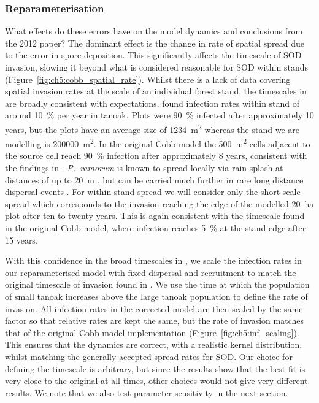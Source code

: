 \subsubsection{Reparameterisation}\label{sec:ch5:reparameterisation}

What effects do these errors have on the model dynamics and conclusions from the 2012 paper? The dominant effect is the change in rate of spatial spread due to the error in spore deposition. This significantly affects the timescale of SOD invasion, slowing it beyond what is considered reasonable for SOD within stands (Figure~\ref{fig:ch5:cobb_spatial_rate}). Whilst there is a lack of data covering spatial invasion rates at the scale of an individual forest stand, the timescales in \citet{cobb_ecosystem_2012} are broadly consistent with expectations. \citet{mcpherson_responses_2010} found infection rates within stand of around \SI{10}{\percent} per year in tanoak. Plots were \SI{90}{\percent} infected after approximately 10 years, but the plots have an average size of \SI{1234}{\meter\squared} whereas the stand we are modelling is \SI{200000}{\meter\squared}. In the original Cobb model the \SI{500}{\meter\squared} cells adjacent to the source cell reach \SI{90}{\percent} infection after approximately 8 years, consistent with the findings in \citet{mcpherson_responses_2010}. \textit{P.~ramorum} is known to spread locally via rain splash at distances of up to \SI{20}{\meter} \citep{davidson_transmission_2005}, but can be carried much further in rare long distance dispersal events \citep{meentemeyer_epidemiological_2011}. For within stand spread we will consider only the short scale spread which corresponds to the invasion reaching the edge of the modelled \SI{20}{\hectare} plot after ten to twenty years. This is again consistent with the timescale found in the original Cobb model, where infection reaches \SI{5}{\percent} at the stand edge after 15 years.

With this confidence in the broad timescales in \citet{cobb_ecosystem_2012}, we scale the infection rates in our reparameterised model with fixed dispersal and recruitment to match the original timescale of invasion found in \citet{cobb_ecosystem_2012}. We use the time at which the population of small tanoak increases above the large tanoak population to define the rate of invasion. All infection rates in the corrected model are then scaled by the same factor so that relative rates are kept the same, but the rate of invasion matches that of the original Cobb model implementation (Figure~\ref{fig:ch5:inf_scaling}). This ensures that the dynamics are correct, with a realistic kernel distribution, whilst matching the generally accepted spread rates for SOD\@. Our choice for defining the timescale is arbitrary, but since the results show that the best fit is very close to the original at all times, other choices would not give very different results. We note that we also test parameter sensitivity in the next section.

